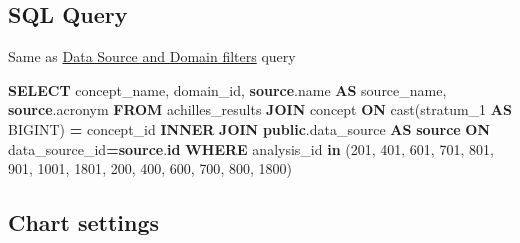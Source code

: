 \documentclass[
]{book}
\newenvironment{Shaded}{\begin{snugshade}}{\end{snugshade}}
\newcommand{\DecValTok}[1]{\textcolor[rgb]{0.00,0.00,0.81}{#1}}
\newcommand{\FunctionTok}[1]{\textcolor[rgb]{0.00,0.00,0.00}{#1}}
\newcommand{\KeywordTok}[1]{\textcolor[rgb]{0.13,0.29,0.53}{\textbf{#1}}}
\newcommand{\NormalTok}[1]{#1}
\newcommand{\OperatorTok}[1]{\textcolor[rgb]{0.81,0.36,0.00}{\textbf{#1}}}
\begin{document}
\hypertarget{sql-query-23}{%
\subsection{SQL Query}\label{sql-query-23}}

Same as \protect\hyperlink{Dataux5cux2520Sourceux5cux2520andux5cux2520Domainux5cux2520Filters}{Data Source and Domain filters} query

\begin{Shaded}
\begin{Highlighting}[]
\KeywordTok{SELECT}\NormalTok{ concept\_name,}
\NormalTok{     domain\_id,}
     \KeywordTok{source}\NormalTok{.name }\KeywordTok{AS}\NormalTok{ source\_name,}
     \KeywordTok{source}\NormalTok{.acronym}
\KeywordTok{FROM}\NormalTok{ achilles\_results}
\KeywordTok{JOIN}\NormalTok{ concept }\KeywordTok{ON} \FunctionTok{cast}\NormalTok{(stratum\_1 }\KeywordTok{AS}\NormalTok{ BIGINT) }\OperatorTok{=}\NormalTok{ concept\_id}
\KeywordTok{INNER} \KeywordTok{JOIN} \KeywordTok{public}\NormalTok{.data\_source }\KeywordTok{AS} \KeywordTok{source} \KeywordTok{ON}\NormalTok{ data\_source\_id}\OperatorTok{=}\KeywordTok{source}\NormalTok{.}\KeywordTok{id}
\KeywordTok{WHERE}\NormalTok{ analysis\_id }\KeywordTok{in}\NormalTok{ (}\DecValTok{201}\NormalTok{, }\DecValTok{401}\NormalTok{, }\DecValTok{601}\NormalTok{, }\DecValTok{701}\NormalTok{, }\DecValTok{801}\NormalTok{, }\DecValTok{901}\NormalTok{, }\DecValTok{1001}\NormalTok{, }\DecValTok{1801}\NormalTok{, }\DecValTok{200}\NormalTok{, }\DecValTok{400}\NormalTok{, }\DecValTok{600}\NormalTok{, }\DecValTok{700}\NormalTok{, }\DecValTok{800}\NormalTok{, }\DecValTok{1800}\NormalTok{)}
\end{Highlighting}
\end{Shaded}

\hypertarget{chart-settings-23}{%
\subsection{Chart settings}\label{chart-settings-23}}
\end{document}
